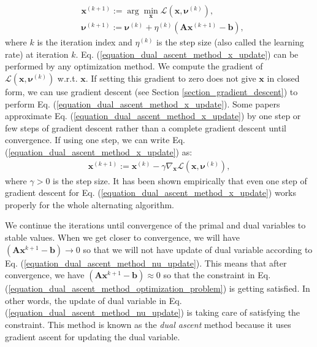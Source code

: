 \documentclass[lang=cn,10pt]{gorgeousnbook}
\numberwithin{equation}{section}%
\numberwithin{figure}{section}%
\begin{document}
\begin{align}
& \boldsymbol{x}^{(k+1)} := \arg\min_{\boldsymbol{x}} \mathcal{L}(\boldsymbol{x}, \boldsymbol{\nu}^{(k)}), \label{equation_dual_ascent_method_x_update} \\
& \boldsymbol{\nu}^{(k+1)} := \boldsymbol{\nu}^{(k)} + \eta^{(k)} (\boldsymbol{A} \boldsymbol{x}^{(k+1)} - \boldsymbol{b}), \label{equation_dual_ascent_method_nu_update}
\end{align}
where $k$ is the iteration index and $\eta^{(k)}$ is the step size (also called the learning rate) at iteration $k$.
Eq. (\ref{equation_dual_ascent_method_x_update}) can be performed by any optimization method. We compute the gradient of $\mathcal{L}(\boldsymbol{x}, \boldsymbol{\nu}^{(k)})$ w.r.t. $\boldsymbol{x}$. If setting this gradient to zero does not give $\boldsymbol{x}$ in closed form, we can use gradient descent (see Section \ref{section_gradient_descent}) to perform Eq. (\ref{equation_dual_ascent_method_x_update}). Some papers approximate Eq. (\ref{equation_dual_ascent_method_x_update}) by one step or few steps of gradient descent rather than a complete gradient descent until convergence. If using one step, we can write Eq. (\ref{equation_dual_ascent_method_x_update}) as:
\begin{align}
\boldsymbol{x}^{(k+1)} := \boldsymbol{x}^{(k)} - \gamma \nabla_{\boldsymbol{x}} \mathcal{L}(\boldsymbol{x}, \boldsymbol{\nu}^{(k)}),
\end{align}
where $\gamma>0$ is the step size.
It has been shown empirically that even one step of gradient descent for Eq. (\ref{equation_dual_ascent_method_x_update}) works properly for the whole alternating algorithm. 

We continue the iterations until convergence of the primal and dual variables to stable values. When we get closer to convergence, we will have $(\boldsymbol{A} \boldsymbol{x}^{k+1} - \boldsymbol{b}) \rightarrow 0$ so that we will not have update of dual variable according to Eq. (\ref{equation_dual_ascent_method_nu_update}). This means that after convergence, we have $(\boldsymbol{A} \boldsymbol{x}^{k+1} - \boldsymbol{b}) \approx 0$ so that the constraint in Eq. (\ref{equation_dual_ascent_method_optimization_problem}) is getting satisfied. 
In other words, the update of dual variable in Eq. (\ref{equation_dual_ascent_method_nu_update}) is taking care of satisfying the constraint. 
This method is known as the \textit{dual ascent} method because it uses gradient ascent for updating the dual variable. 
\end{document}
